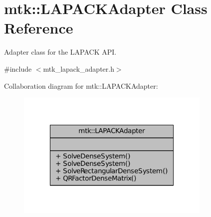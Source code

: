 \hypertarget{classmtk_1_1LAPACKAdapter}{\section{mtk\-:\-:L\-A\-P\-A\-C\-K\-Adapter Class Reference}
\label{classmtk_1_1LAPACKAdapter}
}


Adapter class for the L\-A\-P\-A\-C\-K A\-P\-I.  




{\ttfamily \#include $<$mtk\-\_\-lapack\-\_\-adapter.\-h$>$}



Collaboration diagram for mtk\-:\-:L\-A\-P\-A\-C\-K\-Adapter\-:\nopagebreak
\begin{figure}[H]
\begin{center}
\leavevmode
\includegraphics[width=264pt]{classmtk_1_1LAPACKAdapter__coll__graph}
\end{center}
\end{figure}
